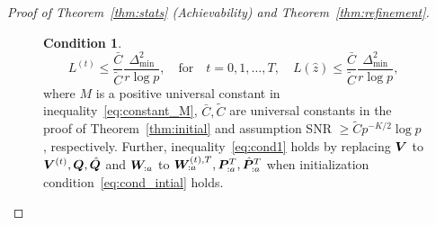 \documentclass[journal]{IEEEtran}
\theoremstyle{definition}
\theoremstyle{definition}
\newtheorem{condition}{Condition}
\newcommand{\of}[1]{\left(#1\right)}
\newcounter{MYtempeqncnt}
\begin{document}
\begin{proof}[Proof of Theorem~\ref{thm:stats} (Achievability) and Theorem~\ref{thm:refinement}]
{\begin{figure}[t]
\begin{condition}
\begin{equation}\label{eq:cond_intial}
    L^{(t)} \leq \frac{\bar C}{\tilde C} \frac{\Delta_{\min}^2}{r \log p}, \quad \text{for} \quad t = 0, 1, \ldots, T, \quad  L(\hat z) \leq \frac{\bar C}{\tilde C} \frac{\Delta_{\min}^2}{r \log p},
\end{equation}
\setcounter{equation}{\value{MYtempeqncnt}} 
where $M$ is a positive universal constant in inequality~\eqref{eq:constant_M}, $\bar C, \tilde C$ are universal constants in {the proof of Theorem~\ref{thm:initial}} and assumption SNR $\geq \tilde C p^{-K/2} \log p$, respectively. Further, inequality~\eqref{eq:cond1} holds by replacing $\bm{V}$ to $\bm{V}^{(t)}, \bm{Q}, \hat {\bm{Q}}$ and $\bm{W}_{:a}$ to $\bm{W}_{:a}^{(t),T}, \bm{P}_{:a}^T, \hat {\bm{P}}_{:a}^T$ when initialization condition~\eqref{eq:cond_intial} holds.
\end{condition}
\hrulefill 
\vspace*{4pt} 
\end{figure}
\setcounter{equation}{67} 




}
\end{proof}
\end{document}
